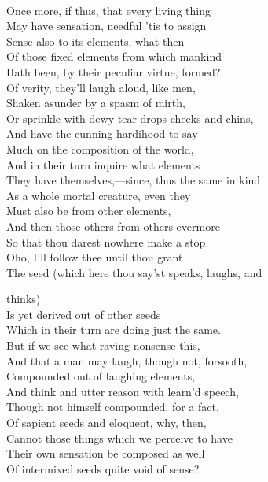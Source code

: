 \\
Once more, if thus, that every living thing\\
May have sensation, needful 'tis to assign\\
Sense also to its elements, what then\\
Of those fixed elements from which mankind\\
Hath been, by their peculiar virtue, formed?\\
Of verity, they'll laugh aloud, like men,\\
Shaken asunder by a spasm of mirth,\\
Or sprinkle with dewy tear-drops cheeks and chins,\\
And have the cunning hardihood to say\\
Much on the composition of the world,\\
And in their turn inquire what elements\\
They have themselves,—since, thus the same in kind\\
As a whole mortal creature, even they\\
Must also be from other elements,\\
And then those others from others evermore—\\
So that thou darest nowhere make a stop.\\
Oho, I'll follow thee until thou grant\\
The seed (which here thou say'st speaks, laughs, and

thinks)\\
Is yet derived out of other seeds\\
Which in their turn are doing just the same.\\
But if we see what raving nonsense this,\\
And that a man may laugh, though not, forsooth,\\
Compounded out of laughing elements,\\
And think and utter reason with learn'd speech,\\
Though not himself compounded, for a fact,\\
Of sapient seeds and eloquent, why, then,\\
Cannot those things which we perceive to have\\
Their own sensation be composed as well\\
Of intermixed seeds quite void of sense?


